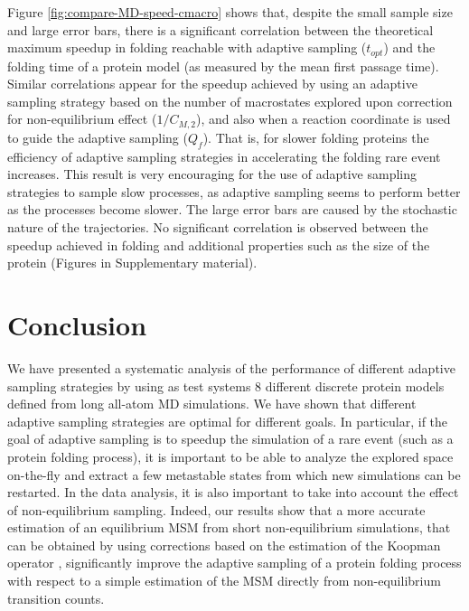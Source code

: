 Figure \ref{fig:compare-MD-speed-cmacro} shows that, despite the small sample size
and large error bars, there is a significant correlation between
the theoretical maximum speedup in folding reachable with adaptive sampling
($t_{opt}$) and the folding time of a protein model (as measured by the mean first passage time).
Similar correlations appear for the speedup achieved by using an adaptive
sampling strategy based on the number of macrostates explored upon correction
for non-equilibrium effect ($1/C_{M, 2}$), and also when a reaction coordinate
is used to guide the adaptive sampling ($Q_f$).
That is, for slower folding proteins the efficiency of adaptive sampling
strategies in accelerating the folding rare event increases. This result is
very encouraging for the use of adaptive sampling strategies to sample slow
processes, as adaptive sampling seems to perform better as the processes become
slower. The large error bars are caused by the stochastic nature of the
trajectories. 
No significant correlation is observed between the speedup achieved in folding
and additional properties such as the size of the protein (Figures in Supplementary material).


\section{\label{sec:conclusion}Conclusion}

We have presented a systematic analysis of the performance of different
adaptive sampling strategies by using as test systems 8 different discrete
protein models defined from long all-atom MD simulations.
We have shown that different adaptive sampling strategies are optimal for
different goals. In particular, if the goal of adaptive sampling is to speedup
the simulation of a rare event (such as a protein folding process), it is
important to be able to analyze the explored space on-the-fly and extract a few
metastable states from which new simulations can be restarted. In the data
analysis, it is also important to take into account the effect of
non-equilibrium sampling. Indeed, our results show that a more accurate
estimation of an equilibrium MSM from short non-equilibrium simulations, that
can be obtained by using corrections based on the estimation of the Koopman
operator \cite{koopmanold, koopman2,koopman3,koopman4,  wu2017variational,
Nueske2017}, significantly improve the adaptive sampling of a
protein folding process with respect to a simple estimation of the MSM directly
from non-equilibrium transition counts.

